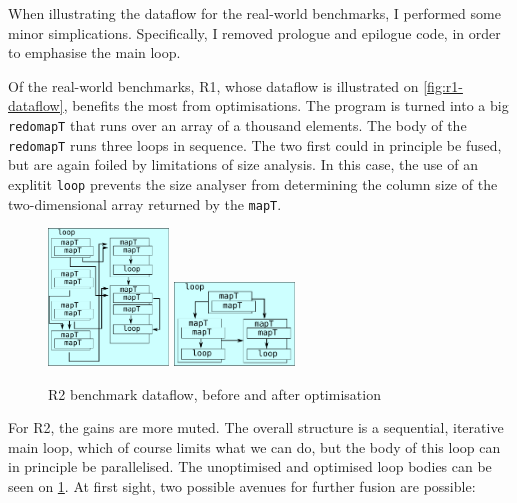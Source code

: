 When illustrating the dataflow for the real-world benchmarks, I
performed some minor simplications.  Specifically, I removed prologue
and epilogue code, in order to emphasise the main loop.

Of the real-world benchmarks, R1, whose dataflow is
illustrated on \cref{fig:r1-dataflow}, benefits the most from
optimisations.  The program is turned into a big \texttt{redomapT}
that runs over an array of a thousand elements.  The body of the
\texttt{redomapT} runs three loops in sequence.  The two first could
in principle be fused, but are again foiled by limitations of size
analysis.  In this case, the use of an explitit \texttt{loop} prevents
the size analyser from determining the column size of the
two-dimensional array returned by the \texttt{mapT}.

\begin{figure}
\begin{center}
\includegraphics[width=3.2cm]{img/HiperfitEgCos-unfused.pdf}
\hspace{1cm}
\includegraphics[width=3.2cm]{img/HiperfitEgCos-fused.pdf}
\end{center}
\caption{R2 benchmark dataflow, before and after optimisation}
\label{fig:r2-dataflow}
\end{figure}

For R2, the gains are more muted.  The overall structure is a
sequential, iterative main loop, which of course limits what we can
do, but the body of this loop can in principle be parallelised.  The
unoptimised and optimised loop bodies can be seen on
\cref{fig:r2-dataflow}.  At first sight, two possible avenues for
further fusion are possible:

